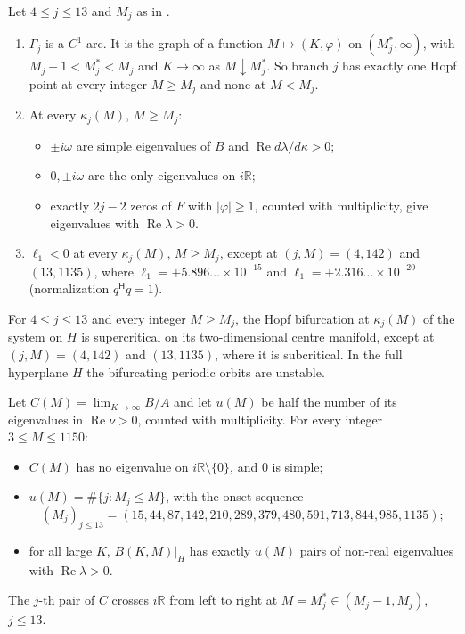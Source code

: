 \documentclass[11pt,a4paper]{report}
\begin{document}
\begin{theorem}[note={branches \(4\le j\le13\)}]\label{thm:A}
Let \(4\le j\le13\) and \(M_j\) as in .
\begin{enumerate}
\item \(\Gamma_j\) is a \(C^1\) arc. It is the graph of a function \(M\mapsto(K,\varphi)\) on \((M^*_j,\infty)\), with
\(M_j-1<M^*_j<M_j\) and \(K\to\infty\) as \(M\downarrow M^*_j\). So branch \(j\) has exactly one Hopf point at every
integer \(M\ge M_j\) and none at \(M<M_j\).
\item At every \(\kappa_j(M)\), \(M\ge M_j\):
  \begin{itemize}
  \item \(\pm i\omega\) are simple eigenvalues of \(B\) and \(\operatorname{Re}d\lambda/d\kappa>0\);
  \item \(0,\pm i\omega\) are the only eigenvalues on \(i\mathbb R\);
  \item exactly \(2j-2\) zeros of \(F\) with \(|\varphi|\ge1\), counted with multiplicity, give eigenvalues with
  \(\operatorname{Re}\lambda>0\).
  \end{itemize}
\item \(\ell_1<0\) at every \(\kappa_j(M)\), \(M\ge M_j\), except at \((j,M)=(4,142)\) and \((13,1135)\), where
\(\ell_1=+5.896\ldots\times10^{-15}\) and \(\ell_1=+2.316\ldots\times10^{-20}\) (normalization \(q^{\mathsf H}q=1\)).
\end{enumerate}
\end{theorem}

\begin{corollary}
For \(4\le j\le13\) and every integer \(M\ge M_j\), the Hopf bifurcation at \(\kappa_j(M)\) of the system on \(H\) is
supercritical on its two-dimensional centre manifold, except at \((j,M)=(4,142)\) and \((13,1135)\), where it is
subcritical. In the full
hyperplane \(H\) the bifurcating periodic orbits are unstable.
\end{corollary}

\begin{theorem}[note={\(K\to\infty\)}]\label{thm:B}
Let \(C(M)=\lim_{K\to\infty}B/A\) and let \(u(M)\) be half the number of its eigenvalues in \(\operatorname{Re}\nu>0\),
counted with multiplicity. For every integer \(3\le M\le1150\):
\begin{itemize}
\item \(C(M)\) has no eigenvalue on \(i\mathbb R\setminus\{0\}\), and \(0\) is simple;
\item \(u(M)=\#\{j:M_j\le M\}\), with the onset sequence
\[
(M_j)_{j\le13}=(15,44,87,142,210,289,379,480,591,713,844,985,1135);
\]
\item for all large \(K\), \(B(K,M)|_H\) has exactly \(u(M)\) pairs of non-real eigenvalues with
\(\operatorname{Re}\lambda>0\).
\end{itemize}
The \(j\)-th pair of \(C\) crosses \(i\mathbb R\) from left to right at \(M=M^*_j\in(M_j-1,M_j)\), \(j\le13\).
\end{theorem}
\end{document}

